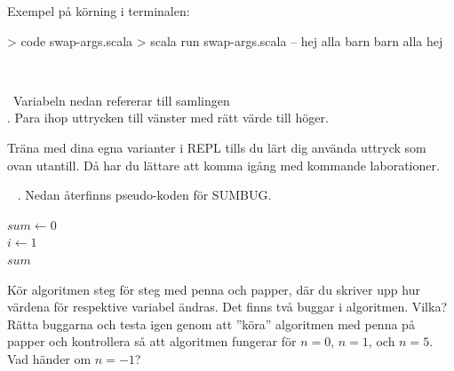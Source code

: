 Exempel på körning i terminalen:
\begin{REPL}
> code swap-args.scala
> scala run swap-args.scala -- hej alla barn
barn alla hej
\end{REPL}

\SOLUTION

\TaskSolved \what~


\QUESTEND




\QUESTBEGIN

\Task \what~Variabeln  nedan refererar till samlingen \\. Para ihop uttrycken till vänster med rätt värde till höger.

\begin{ConceptConnections}

\end{ConceptConnections}

\noindent Träna med dina egna varianter i REPL tills du lärt dig använda uttryck som ovan utantill. Då har du lättare att komma igång med kommande laborationer.

\SOLUTION

\TaskSolved \what

\begin{ConceptConnections}

\end{ConceptConnections}

\QUESTEND







\QUESTBEGIN

\Task  \what~ . Nedan återfinns pseudo-koden för SUMBUG.

\begin{algorithm}[H]

 $sum \leftarrow 0$ \\
 $i \leftarrow 1$  \\
 $sum$
\end{algorithm}

\Subtask Kör algoritmen steg för steg med penna och papper, där du skriver upp hur värdena för respektive variabel ändras. Det finns två buggar i algoritmen. Vilka? Rätta buggarna och testa igen genom att ''köra'' algoritmen med penna på papper och kontrollera så att algoritmen fungerar för $n=0$, $n=1$, och $n=5$. Vad händer om $n=-1$?

